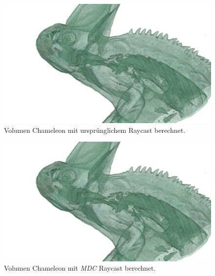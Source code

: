\iffalse




\begin{landscape}
	\begin{figure}
		\centering
		\includegraphics[width=1\textheight]{../../Grafiken/results/picture_quality/chameleon/Standard_img-1_Ray-1-5.png}
		\caption{Volumen Chameleon mit ursprünglichem Raycast berechnet.}
		\label{fig::res::cam_st}
	\end{figure}
\end{landscape}

\begin{landscape}
	\begin{figure}
		\centering
		\includegraphics[width=1\textheight]{../../Grafiken/results/picture_quality/chameleon/MDC_img-0-96_ray-1-5.png}
		\caption{Volumen Chameleon mit \emph{MDC} Raycast berechnet.}
		\label{fig::res::cam_mdc}
	\end{figure}
\end{landscape}

